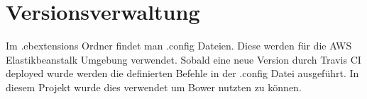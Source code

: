 \chapter{Versionsverwaltung}
Im .ebextensions Ordner findet man .config Dateien. Diese werden für die AWS Elastikbeanstalk Umgebung verwendet. Sobald eine neue Version durch Travis CI deployed wurde werden die definierten Befehle in der .config Datei ausgeführt. In diesem Projekt wurde dies verwendet um Bower nutzten zu können.